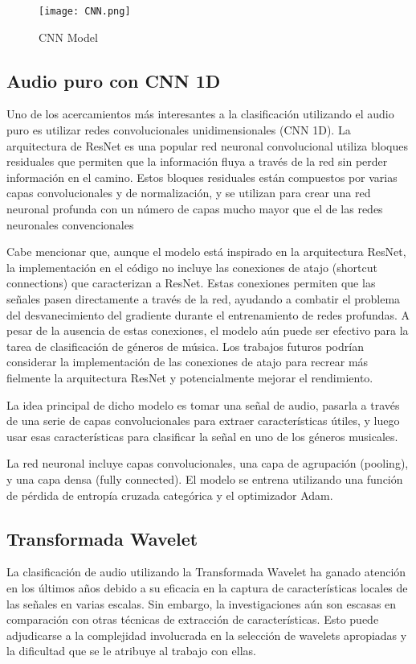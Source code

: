 \documentclass[colorinlistoftodos,twoside,twocolumn,10pt]{article} %
\begin{document}
\begin{figure}[h!] 
	\centering
	\texttt{[image: CNN.png]}
	\caption{CNN Model}
\end{figure}


\subsection{Audio puro con CNN 1D}
Uno de los acercamientos m\'as interesantes a la clasificaci\'on utilizando el audio puro es utilizar redes convolucionales unidimensionales (CNN 1D). La arquitectura de ResNet \cite{ResNet} es una popular red neuronal convolucional utiliza bloques residuales que permiten que la información fluya a través de la red sin perder información en el camino. Estos bloques residuales están compuestos por varias capas convolucionales y de normalización, y se utilizan para crear una red neuronal profunda con un número de capas mucho mayor que el de las redes neuronales convencionales

Cabe mencionar que, aunque el modelo est\'a inspirado en la arquitectura ResNet, la implementaci\'on en el c\'odigo no incluye las conexiones de atajo (shortcut connections) que caracterizan a ResNet. Estas conexiones permiten que las se\~nales pasen directamente a trav\'es de la red, ayudando a combatir el problema del desvanecimiento del gradiente durante el entrenamiento de redes profundas. A pesar de la ausencia de estas conexiones, el modelo a\'un puede ser efectivo para la tarea de clasificaci\'on de g\'eneros de m\'usica. Los trabajos futuros podr\'ian considerar la implementaci\'on de las conexiones de atajo para recrear m\'as fielmente la arquitectura ResNet y potencialmente mejorar el rendimiento.

La idea principal de dicho modelo es tomar una se\~nal de audio, pasarla a trav\'es de una serie de capas convolucionales para extraer caracter\'isticas \'utiles, y luego usar esas caracter\'isticas para clasificar la se\~nal en uno de los g\'eneros musicales.

La red neuronal incluye capas convolucionales, una capa de agrupaci\'on (pooling), y una capa densa (fully connected). El modelo se entrena utilizando una funci\'on de p\'erdida de entrop\'ia cruzada categ\'orica y el optimizador Adam.

\subsection{Transformada Wavelet}
La clasificaci\'on de audio utilizando la Transformada Wavelet ha ganado atenci\'on en los \'ultimos años debido a su eficacia en la captura de características locales de las se\~nales en varias escalas. Sin embargo, la investigaciones a\'un son escasas en comparaci\'on con otras t\'ecnicas de extracci\'on de caracter\'isticas. Esto puede adjudicarse a la complejidad involucrada en la selecci\'on de wavelets apropiadas y la dificultad que se le atribuye al trabajo con ellas\cite{wavelet transform in machine learning}.
\end{document}
